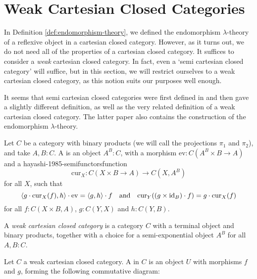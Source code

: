 \chapter{Weak Cartesian Closed Categories}
In Definition \ref{def:endomorphism-theory}, we defined the endomorphism $ \lambda $-theory of a reflexive object in a cartesian closed category. However, as it turns out, we do not need all of the properties of a cartesian closed category. It suffices to consider a \textit{weak} cartesian closed category. In fact, even a `semi cartesian closed category' will suffice, but in this section, we will restrict ourselves to a weak cartesian closed category, as this notion suits our purposes well enough.

It seems that semi cartesian closed categories were first defined in \cite{hayashi-1985-semifunctors} and then \cite{hoofman-1993-semi-cartesian-closed} gave a slightly different definition, as well as the very related definition of a weak cartesian closed category. The latter paper also contains the construction of the endomorphism $ \lambda $-theory.

\begin{definition}
  Let $ C $ be a category with binary products (we will call the projections $ \pi_1 $ and $ \pi_2 $), and take $ A, B : C $. A  is an object $ A^B : C $, with a morphism $ \mathrm{ev}: C(A^B \times B \to A) $ and a hayashi-1985-semifunctorsfunction
  \[ \mathrm{cur}_X: C(X \times B \to A) \to C(X, A^B) \]
  for all $ X $, such that
  \[ \langle g \cdot \mathrm{cur}_X(f), h \rangle \cdot \mathrm{ev} = \langle g, h \rangle \cdot f \quad \text{and} \quad \mathrm{cur}_Y((g \times \text{id}_{B}) \cdot f) = g \cdot \mathrm{cur}_X(f) \]
  for all $ f: C(X \times B, A) $, $ g : C(Y, X) $ and $ h : C(Y, B) $.
\end{definition}

\begin{definition}
  A \textit{weak cartesian closed category} is a category $ C $ with a terminal object and binary products, together with a choice for a semi-exponential object $ A^B $ for all $ A, B : C $.
\end{definition}

\begin{definition}
  Let $ C $ a weak cartesian closed category. A  in $ C $ is an object $ U $ with morphisms $ f $ and $ g $, forming the following commutative diagram:
  \begin{center}
  \end{center}
\end{definition}

